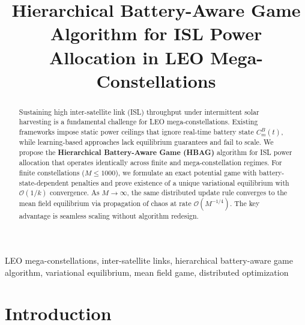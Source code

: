 \documentclass[journal]{IEEEtran}
\newcommand{\CB}{C^{B}}
\begin{document}
\title{Hierarchical Battery-Aware Game Algorithm 
for ISL Power Allocation in LEO Mega-Constellations}

\author{
}

\maketitle

\begin{abstract}
Sustaining high inter-satellite link (ISL) throughput under intermittent solar harvesting is a fundamental challenge for LEO mega-constellations. Existing frameworks impose static power ceilings that ignore real-time battery state $\CB_m(t)$, while learning-based approaches lack equilibrium guarantees and fail to scale. We propose the \textbf{Hierarchical Battery-Aware Game (HBAG)} algorithm for ISL power allocation that operates identically across finite and mega-constellation regimes. For finite constellations ($M \leq 1000$), we formulate an exact potential game with battery-state-dependent penalties and prove existence of a unique variational equilibrium with $\mathcal{O}(1/k)$ convergence. As $M\to\infty$, the same distributed update rule converges to the mean field equilibrium via propagation of chaos at rate $\mathcal{O}(M^{-1/4})$. The key advantage is seamless scaling without algorithm redesign.
\end{abstract}

\begin{IEEEkeywords}
LEO mega-constellations, inter-satellite links, hierarchical battery-aware game algorithm, variational equilibrium, mean field game, distributed optimization
\end{IEEEkeywords}

\section{Introduction}
\label{sec:intro}
\end{document}

